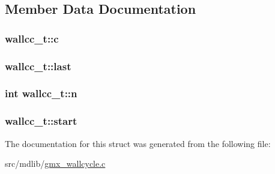 \subsection{\-Member \-Data \-Documentation}
\hypertarget{structwallcc__t_a0c4022d025474b8421fee15aac110d80}{
\subsubsection[{c}]{ {\bf wallcc\-\_\-t\-::c}}}\label{structwallcc__t_a0c4022d025474b8421fee15aac110d80}
\hypertarget{structwallcc__t_af28e1664dc80ef396b6f3dde3e8c637b}{
\subsubsection[{last}]{ {\bf wallcc\-\_\-t\-::last}}}\label{structwallcc__t_af28e1664dc80ef396b6f3dde3e8c637b}
\hypertarget{structwallcc__t_a97149b622573f6fb03345b02f059bd62}{
\subsubsection[{n}]{\setlength{\rightskip}{0pt plus 5cm}int {\bf wallcc\-\_\-t\-::n}}}\label{structwallcc__t_a97149b622573f6fb03345b02f059bd62}
\hypertarget{structwallcc__t_a7362bf7db118cf1554ff10b547d8154f}{
\subsubsection[{start}]{ {\bf wallcc\-\_\-t\-::start}}}\label{structwallcc__t_a7362bf7db118cf1554ff10b547d8154f}


\-The documentation for this struct was generated from the following file\-:\begin{DoxyCompactItemize}
\item 
src/mdlib/\hyperlink{gmx__wallcycle_8c}{gmx\-\_\-wallcycle.\-c}\end{DoxyCompactItemize}
